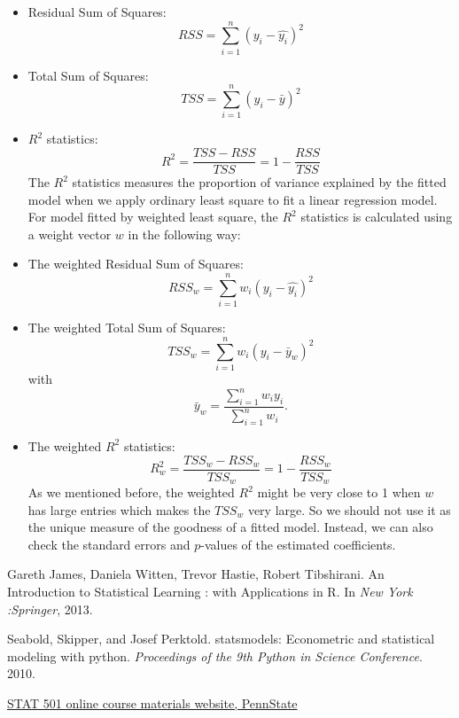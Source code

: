 \documentclass{article}
\begin{document}
\begin{itemize}
\item Residual Sum of Squares: $$RSS = \sum_{i=1}^n (y_i - \hat{y_i})^2$$
\item Total Sum of Squares: $$TSS = \sum_{i=1}^n (y_i - \bar{y})^2$$
\item $R^2$ statistics: $$R^2 = \frac{TSS - RSS}{TSS} = 1 - \frac{RSS}{TSS}$$ 
The $R^2$ statistics measures the proportion of variance explained by the fitted model when we apply ordinary least square to fit a linear regression model. For model fitted by weighted least square, the $R^2$ statistics is calculated using a weight vector $w$ in the following way:

\item The weighted Residual Sum of Squares: $$RSS_w = \sum_{i=1}^n w_i (y_i - \hat{y_i})^2$$
\item The weighted Total Sum of Squares: $$TSS_w = \sum_{i=1}^n w_i (y_i - \bar{y}_w)^2$$
with $$\bar{y}_w = \frac{\sum_{i=1}^n w_i y_i} {\sum_{i=1}^n w_i} .$$
\item The weighted $R^2$ statistics: $$R^2_w = \frac{TSS_w - RSS_w}{TSS_w} = 1 - \frac{RSS_w}{TSS_w}$$ 
As we mentioned before, the weighted $R^2$ might be very close to 1 when $w$ has large entries which makes the $TSS_w$ very large. So we should not use it as the unique measure of the goodness of a fitted model. Instead, we can also check the standard errors and $p$-values of the estimated coefficients. 
\end{itemize} 


\begin{thebibliography}{100}
 
   Gareth James, Daniela Witten, Trevor Hastie, Robert Tibshirani. An Introduction to Statistical Learning : with Applications in R. In \emph{New York :Springer}, 2013.
 
   Seabold, Skipper, and Josef Perktold. statsmodels: Econometric and statistical modeling with python. \emph{Proceedings of the 9th Python in Science Conference}. 2010.

  \href{https://online.stat.psu.edu/stat501/lesson/13}{STAT 501 online course materials website, PennState}


\end{thebibliography}
\end{document}
